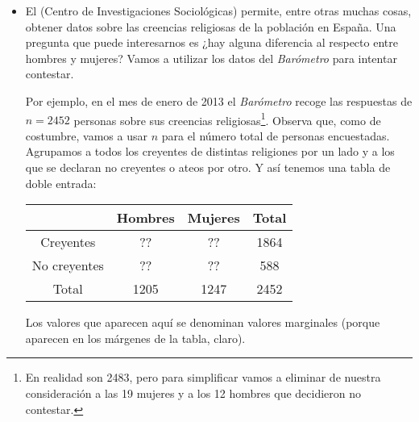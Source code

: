 \begin{itemize}

    \item El  (Centro de Investigaciones Sociológicas) permite, entre otras muchas cosas, obtener datos sobre las creencias religiosas de la población en España. Una pregunta que puede interesarnos es ¿hay alguna diferencia al respecto entre hombres y mujeres? Vamos a utilizar los datos del {\em Barómetro} para intentar contestar.

        Por ejemplo, en el mes de enero de 2013 el {\em Barómetro} recoge las respuestas de $n=2452$ personas sobre sus creencias religiosas\footnote{En realidad son 2483, pero para simplificar vamos a eliminar de nuestra consideración a las 19 mujeres y a los 12 hombres que decidieron no contestar.}. Observa que, como de costumbre, vamos a usar $n$ para el número total de personas encuestadas. Agrupamos a todos los creyentes de distintas religiones por un lado y a los que se declaran no creyentes o ateos por otro. Y así tenemos una tabla de doble entrada:
        \begin{center}
        \begin{tabular}{|c|c|c|c|}
          \hline
           & Hombres & Mujeres & Total \\
           \hline
          Creyentes & ?? & ?? & 1864 \\
          \hline
          No creyentes & ?? & ?? & 588 \\
          \hline
          Total & 1205 & 1247 & 2452 \\
          \hline
        \end{tabular}
        \end{center}
        Los valores que aparecen aquí se denominan {\sf valores marginales} (porque aparecen en los márgenes de la tabla, claro).


\end{itemize}
